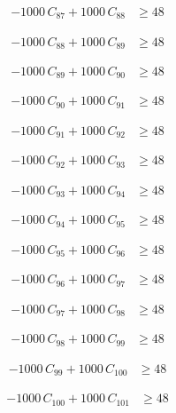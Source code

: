 \documentclass[a4paper,11pt]{article}
\begin{document}
\begin{align}
-1000\,C_{87} + 1000\,C_{88} &\geq 48 \nonumber
\end{align}

\begin{align}
-1000\,C_{88} + 1000\,C_{89} &\geq 48 \nonumber
\end{align}

\begin{align}
-1000\,C_{89} + 1000\,C_{90} &\geq 48 \nonumber
\end{align}

\begin{align}
-1000\,C_{90} + 1000\,C_{91} &\geq 48 \nonumber
\end{align}

\begin{align}
-1000\,C_{91} + 1000\,C_{92} &\geq 48 \nonumber
\end{align}

\begin{align}
-1000\,C_{92} + 1000\,C_{93} &\geq 48 \nonumber
\end{align}

\begin{align}
-1000\,C_{93} + 1000\,C_{94} &\geq 48 \nonumber
\end{align}

\begin{align}
-1000\,C_{94} + 1000\,C_{95} &\geq 48 \nonumber
\end{align}

\begin{align}
-1000\,C_{95} + 1000\,C_{96} &\geq 48 \nonumber
\end{align}

\begin{align}
-1000\,C_{96} + 1000\,C_{97} &\geq 48 \nonumber
\end{align}

\begin{align}
-1000\,C_{97} + 1000\,C_{98} &\geq 48 \nonumber
\end{align}

\begin{align}
-1000\,C_{98} + 1000\,C_{99} &\geq 48 \nonumber
\end{align}

\begin{align}
-1000\,C_{99} + 1000\,C_{100} &\geq 48 \nonumber
\end{align}

\begin{align}
-1000\,C_{100} + 1000\,C_{101} &\geq 48 \nonumber
\end{align}
\end{document}
